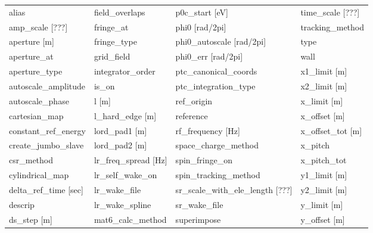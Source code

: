  \begin{tabular}{llll} \toprule
alias                          & field_overlaps                 & p0c_start [eV]                 & time_scale [???]               \\
amp_scale [???]                & fringe_at                      & phi0 [rad/2pi]                 & tracking_method                \\
aperture [m]                   & fringe_type                    & phi0_autoscale [rad/2pi]       & type                           \\
aperture_at                    & grid_field                     & phi0_err [rad/2pi]             & wall                           \\
aperture_type                  & integrator_order               & ptc_canonical_coords           & x1_limit [m]                   \\
autoscale_amplitude            & is_on                          & ptc_integration_type           & x2_limit [m]                   \\
autoscale_phase                & l [m]                          & ref_origin                     & x_limit [m]                    \\
cartesian_map                  & l_hard_edge [m]                & reference                      & x_offset [m]                   \\
constant_ref_energy            & lord_pad1 [m]                  & rf_frequency [Hz]              & x_offset_tot [m]               \\
create_jumbo_slave             & lord_pad2 [m]                  & space_charge_method            & x_pitch                        \\
csr_method                     & lr_freq_spread [Hz]            & spin_fringe_on                 & x_pitch_tot                    \\
cylindrical_map                & lr_self_wake_on                & spin_tracking_method           & y1_limit [m]                   \\
delta_ref_time [sec]           & lr_wake_file                   & sr_scale_with_ele_length [???] & y2_limit [m]                   \\
descrip                        & lr_wake_spline                 & sr_wake_file                   & y_limit [m]                    \\
ds_step [m]                    & mat6_calc_method               & superimpose                    & y_offset [m]                   \\

\end{tabular}

